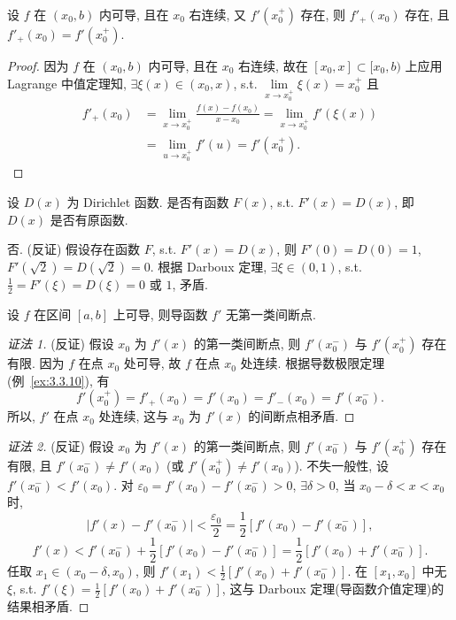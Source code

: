 \begin{example}[导数极限定理]\label{ex:3.3.10}
设 $f$ 在 $(x_0,b)$ 内可导, 且在 $x_0$ 右连续, 又 $f'(x_0^+)$ 存在, 则 $f'_+(x_0)$ 存在, 且 $f'_+(x_0)=f'(x_0^+)$.
\end{example}

\begin{proof}
因为 $f$ 在 $(x_0,b)$ 内可导, 且在 $x_0$ 右连续, 故在 $[x_0,x]\subset[x_0,b)$ 上应用 Lagrange 中值定理知, $\exists\xi(x)\in(x_0,x)$, s.t. $\lim\limits_{x\to x_0^+}\xi(x)=x_0^+$ 且
\[
\begin{aligned}
f'_+(x_0)&=\lim_{x\to x_0^+}\frac{f(x)-f(x_0)}{x-x_0}=\lim_{x\to x_0^+}f'(\xi(x))\\
&=\lim_{u\to x_0^+}f'(u)=f'(x_0^+).
\end{aligned}
\]
\end{proof}

\begin{example}\label{ex:3.3.11}
设 $D(x)$ 为 Dirichlet 函数. 是否有函数 $F(x)$, s.t. $F'(x)=D(x)$, 即 $D(x)$ 是否有原函数.
\end{example}

\begin{solution}
否. (反证) 假设存在函数 $F$, s.t. $F'(x)=D(x)$, 则 $F'(0)=D(0)=1$, $F'(\sqrt{2})=D(\sqrt{2})=0$. 根据 Darboux 定理, $\exists\xi\in(0,1)$, s.t. $\frac{1}{2}=F'(\xi)=D(\xi)=0$ 或 $1$, 矛盾.
\end{solution}

\begin{example}\label{ex:3.3.12}
设 $f$ 在区间 $[a,b]$ 上可导, 则导函数 $f'$ 无第一类间断点.
\end{example}

\begin{proof}[证法 1]
(反证) 假设 $x_0$ 为 $f'(x)$ 的第一类间断点, 则 $f'(x_0^-)$ 与 $f'(x_0^+)$ 存在有限. 因为 $f$ 在点 $x_0$ 处可导, 故 $f$ 在点 $x_0$ 处连续. 根据导数极限定理(例~\ref{ex:3.3.10}), 有
\[
f'(x_0^+)=f'_+(x_0)=f'(x_0)=f'_-(x_0)=f'(x_0^-).
\]
所以, $f'$ 在点 $x_0$ 处连续, 这与 $x_0$ 为 $f'(x)$ 的间断点相矛盾.
\end{proof}

\begin{proof}[证法 2]
(反证) 假设 $x_0$ 为 $f'(x)$ 的第一类间断点, 则 $f'(x_0^-)$ 与 $f'(x_0^+)$ 存在有限, 且 $f'(x_0^-)\neq f'(x_0)$ (或 $f'(x_0^+)\neq f'(x_0)$). 不失一般性, 设 $f'(x_0^-)<f'(x_0)$. 对 $\varepsilon_0=f'(x_0)-f'(x_0^-)>0$, $\exists\delta>0$, 当 $x_0-\delta<x<x_0$ 时,
\[
|f'(x)-f'(x_0^-)|<\frac{\varepsilon_0}{2}=\frac{1}{2}[f'(x_0)-f'(x_0^-)],
\]
\[
f'(x)<f'(x_0^-)+\frac{1}{2}[f'(x_0)-f'(x_0^-)]=\frac{1}{2}[f'(x_0)+f'(x_0^-)].
\]
任取 $x_1\in(x_0-\delta,x_0)$, 则 $f'(x_1)<\frac{1}{2}[f'(x_0)+f'(x_0^-)]$. 在 $[x_1,x_0]$ 中无 $\xi$, s.t. $f'(\xi)=\frac{1}{2}[f'(x_0)+f'(x_0^-)]$, 这与 Darboux 定理(导函数介值定理)的结果相矛盾.
\end{proof}

